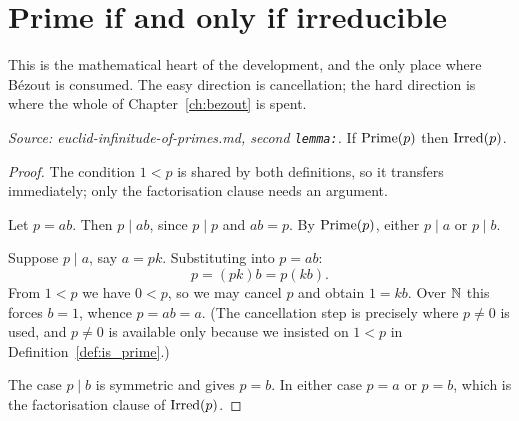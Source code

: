 \chapter{Prime if and only if irreducible}
\label{ch:irreducible}

This is the mathematical heart of the development, and the only place where
B\'ezout is consumed. The easy direction is cancellation; the hard direction is
where the whole of Chapter~\ref{ch:bezout} is spent.

\begin{theorem}
  \leanok
  \label{thm:prime_imp_irreducible}
  \textit{Source: euclid-infinitude-of-primes.md, second \texttt{lemma:}.}
  If $\mathrm{Prime}(p)$ then $\mathrm{Irred}(p)$.
\end{theorem}
\begin{proof}

\leanok
  The condition $1 < p$ is shared by both definitions, so it transfers
  immediately; only the factorisation clause needs an argument.

  Let $p = a b$. Then $p \mid a b$, since $p \mid p$ and $ab = p$. By
  $\mathrm{Prime}(p)$, either $p \mid a$ or $p \mid b$.

  Suppose $p \mid a$, say $a = p k$. Substituting into $p = a b$:
  \[
    p = (p k) b = p (k b) .
  \]
  From $1 < p$ we have $0 < p$, so we may cancel $p$ and obtain $1 = k b$. Over
  $\mathbb{N}$ this forces $b = 1$, whence $p = a b = a$. (The cancellation step is
  precisely where $p \neq 0$ is used, and $p \neq 0$ is available only because
  we insisted on $1 < p$ in Definition~\ref{def:is_prime}.)

  The case $p \mid b$ is symmetric and gives $p = b$. In either case
  $p = a$ or $p = b$, which is the factorisation clause of $\mathrm{Irred}(p)$.
\end{proof}

